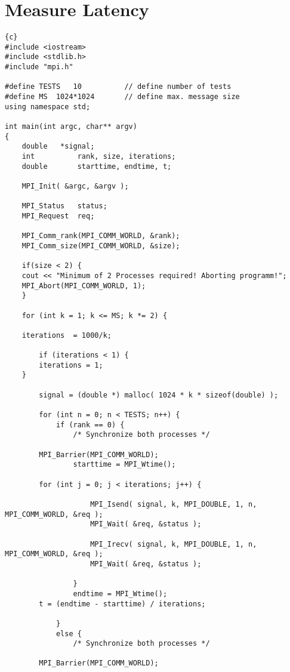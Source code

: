 \documentclass{article}
\newcommand{\enterProblemHeader}[1]{
}
\newcommand{\exitProblemHeader}[1]{
}
\newcounter{homeworkProblemCounter} %
\newcommand{\homeworkProblemName}{}
\newenvironment{homeworkProblem}[1][Problem \arabic{homeworkProblemCounter}]{ %
\stepcounter{homeworkProblemCounter} %
\renewcommand{\homeworkProblemName}{#1} %
\section{\homeworkProblemName} %
}{
}
\begin{document}
\clearpage
\begin{homeworkProblem}[Measure Latency]
\begin{lstlisting}{c}
#include <iostream>
#include <stdlib.h>
#include "mpi.h"

#define TESTS 	10			// define number of tests
#define MS 	1024*1024		// define max. message size
using namespace std;

int main(int argc, char** argv)
{
    double 	 *signal;
    int          rank, size, iterations;
    double       starttime, endtime, t;
   
    MPI_Init( &argc, &argv );
	
    MPI_Status   status;
    MPI_Request  req;

    MPI_Comm_rank(MPI_COMM_WORLD, &rank);
    MPI_Comm_size(MPI_COMM_WORLD, &size);

    if(size < 2) {
	cout << "Minimum of 2 Processes required! Aborting programm!";
	MPI_Abort(MPI_COMM_WORLD, 1);
    }

    for (int k = 1; k <= MS; k *= 2) {
	
	iterations  = 1000/k;
	
        if (iterations < 1) { 
		iterations = 1;
	}

        signal = (double *) malloc( 1024 * k * sizeof(double) );

        for (int n = 0; n < TESTS; n++) {
            if (rank == 0) {
                /* Synchronize both processes */
		
		MPI_Barrier(MPI_COMM_WORLD); 
                starttime = MPI_Wtime();
                
		for (int j = 0; j < iterations; j++) {
		  
                    MPI_Isend( signal, k, MPI_DOUBLE, 1, n, MPI_COMM_WORLD, &req );
                    MPI_Wait( &req, &status );
		    
                    MPI_Irecv( signal, k, MPI_DOUBLE, 1, n, MPI_COMM_WORLD, &req );
                    MPI_Wait( &req, &status );
		    
                }
                endtime = MPI_Wtime();
		t = (endtime - starttime) / iterations;
                
            }
            else {
                /* Synchronize both processes */
		
		MPI_Barrier(MPI_COMM_WORLD);
                

\end{lstlisting}
\end{homeworkProblem}
\end{document}
